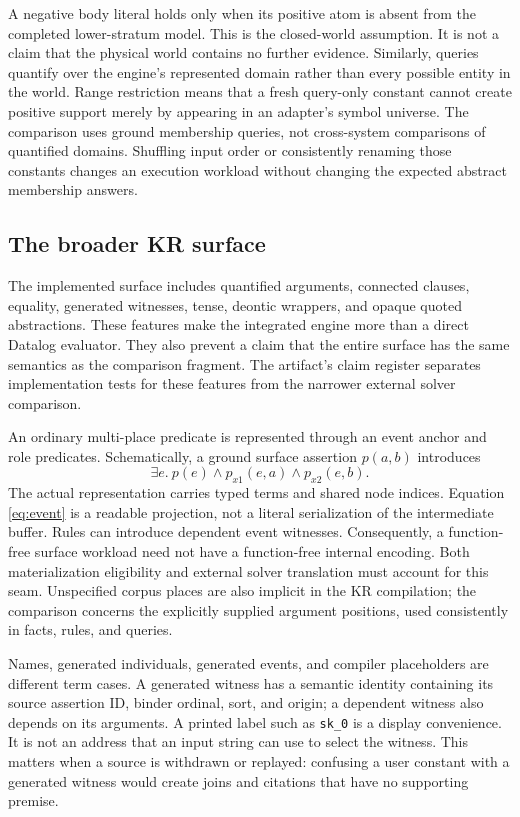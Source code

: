 A negative body literal holds only when its positive atom is absent from the
completed lower-stratum model. This is the closed-world assumption. It is not a
claim that the physical world contains no further evidence. Similarly, queries
quantify over the engine's represented domain rather than every possible entity
in the world. Range restriction means that a fresh query-only constant cannot
create positive support merely by appearing in an adapter's symbol universe.
The comparison uses ground membership queries, not cross-system comparisons
of quantified domains. Shuffling input order or consistently renaming
those constants changes an execution workload without changing the expected
abstract membership answers.

\subsection{The broader KR surface}

The implemented surface includes quantified arguments, connected clauses,
equality, generated witnesses, tense, deontic wrappers, and opaque quoted
abstractions. These features make the integrated engine more than a direct
Datalog evaluator. They also prevent a claim that the entire surface has the
same semantics as the comparison fragment. The artifact's claim register
separates implementation tests for these features from the narrower external
solver comparison.

An ordinary multi-place predicate is represented through an event anchor and
role predicates. Schematically, a ground surface assertion $p(a,b)$ introduces
\begin{equation}
 \exists e.\ p(e)\land p_{x1}(e,a)\land p_{x2}(e,b).
 \label{eq:event}
\end{equation}
The actual representation carries typed terms and shared node indices. Equation
\ref{eq:event} is a readable projection, not a literal serialization of the
intermediate buffer. Rules can introduce dependent event witnesses. Consequently,
a function-free surface workload need not have a function-free internal encoding.
Both materialization eligibility and external solver translation must account
for this seam. Unspecified corpus places are also implicit in the KR compilation;
the comparison concerns the explicitly supplied argument positions, used
consistently in facts, rules, and queries.

Names, generated individuals, generated events, and compiler placeholders are
different term cases. A generated witness has a semantic identity containing its
source assertion ID, binder ordinal, sort, and origin; a dependent witness also
depends on its arguments. A printed label such as \texttt{sk\_0} is a display
convenience. It is not an address that an input string can use to select the
witness. This matters when a source is withdrawn or replayed: confusing a user
constant with a generated witness would create joins and citations that have
no supporting premise.

